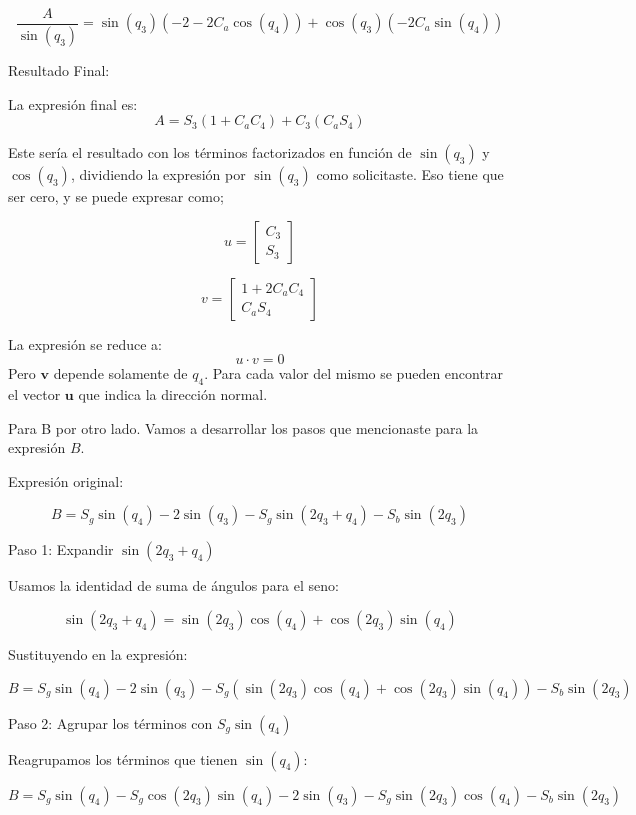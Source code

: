 \documentclass[a4paper,12pt]{article}
\begin{document}
\[
\frac{A}{\sin(q_3)} = \sin(q_3)(-2 - 2C_a \cos(q_4)) + \cos(q_3)(-2C_a \sin(q_4))
\]

Resultado Final:

La expresión final es:
\[
A = S_3(1 + C_a C_4) + C_3(C_a S_4)
\]

Este sería el resultado con los términos factorizados en función de \(\sin(q_3)\) y \(\cos(q_3)\), dividiendo la expresión por \(\sin(q_3)\) como solicitaste.
Eso tiene que ser cero, y se puede expresar como;

\begin{equation}
    u =
    \begin{bmatrix}
        C_3\\
        S_3
    \end{bmatrix}
\end{equation}

\begin{equation}
    v =
    \begin{bmatrix}
        1 + 2C_aC_4\\
        C_aS_4
    \end{bmatrix}
\end{equation}

La expresión se reduce a:
\[u \cdot v = 0\]
Pero $\mathbf{v}$ depende solamente de $q_4$. Para cada valor del mismo
se pueden encontrar el vector $\mathbf{u}$ que indica la dirección normal.

Para B por otro lado.
Vamos a desarrollar los pasos que mencionaste para la expresión \( B \).

 Expresión original:

\[
B = S_g \sin(q_4) - 2\sin(q_3) - S_g \sin(2q_3 + q_4) - S_b \sin(2q_3)
\]

 Paso 1: Expandir \(\sin(2q_3 + q_4)\)

Usamos la identidad de suma de ángulos para el seno:

\[
\sin(2q_3 + q_4) = \sin(2q_3)\cos(q_4) + \cos(2q_3)\sin(q_4)
\]

Sustituyendo en la expresión:

\[
B = S_g \sin(q_4) - 2\sin(q_3) - S_g (\sin(2q_3)\cos(q_4) + \cos(2q_3)\sin(q_4)) - S_b \sin(2q_3)
\]

 Paso 2: Agrupar los términos con \( S_g \sin(q_4) \)

Reagrupamos los términos que tienen \( \sin(q_4) \):

\[
B = S_g \sin(q_4) - S_g \cos(2q_3)\sin(q_4) - 2\sin(q_3) - S_g \sin(2q_3)\cos(q_4) - S_b \sin(2q_3)
\]
\end{document}
